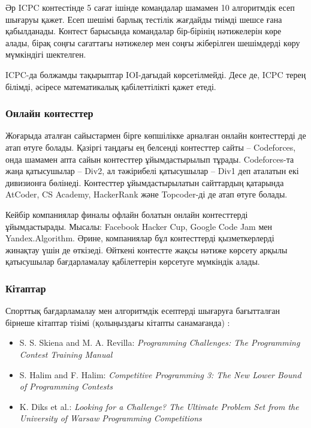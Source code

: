 Әр ICPC контестінде 5 сағат ішінде командалар
шамамен 10 алгоритмдік есеп шығаруы қажет.
Есеп шешімі барлық тестілік жағдайды тиімді шешсе ғана
қабылданады.
Контест барысында командалар бір-бірінің нәтижелерін көре алады,
бірақ соңғы сағаттағы нәтижелер мен соңғы жіберілген шешімдерді көру мүмкіндігі шектелген.

ICPC-да болжамды тақырыптар IOI-дағыдай көрсетілмейді.
Десе де, ICPC терең білімді, әсіресе математикалық қабілеттілікті қажет етеді.

\subsubsection{Онлайн контесттер}

Жоғарыда аталған сайыстармен бірге көпшілікке арналған онлайн контесттерді де атап өтуге болады.
Қазіргі таңдағы ең белсенді контесттер сайты -- Codeforces,
онда шамамен апта сайын контесттер ұйымдастырылып тұрады.
Codeforces-та жаңа қатысушылар -- Div2, ал тәжірибелі қатысушылар -- Div1 деп аталатын екі дивизионға бөлінеді.
Контесттер ұйымдастырылатын сайттардың қатарында AtCoder, CS Academy, HackerRank және Topcoder-ді де атап өтуге болады. 

Кейбір компаниялар финалы офлайн болатын онлайн контесттерді ұйымдастырады.
Мысалы: Facebook Hacker Cup,
Google Code Jam мен Yandex.Algorithm.
Әрине, компаниялар бұл контесттерді қызметкерлерді жинақтау үшін де өткізеді. Өйткені контестте жақсы нәтиже көрсету арқылы қатысушылар бағдарламалау қабілеттерін көрсетуге мүмкіндік алады.

\subsubsection{Кітаптар}

Спорттық бағдарламалау мен алгоритмдік есептерді шығаруға бағытталған
бірнеше кітаптар тізімі (қолыңыздағы кітапты санамағанда) :

\begin{itemize}
\item S. S. Skiena and M. A. Revilla: 
\emph{Programming Challenges: The Programming Contest Training Manual} \cite{ski03}
\item S. Halim and F. Halim:
\emph{Competitive Programming 3: The New Lower Bound of Programming Contests} \cite{hal13}
\item K. Diks et al.: \emph{Looking for a Challenge? The Ultimate Problem Set from
the University of Warsaw Programming Competitions} \cite{dik12}
\end{itemize}

